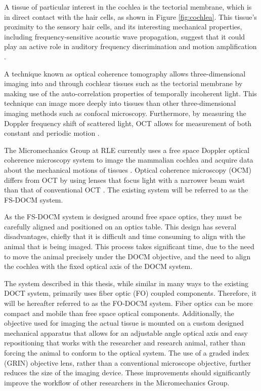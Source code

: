 A tissue of particular interest in the cochlea is the tectorial membrane, which is in direct contact with the hair cells, as shown in Figure \ref{fig:cochlea}. This tissue's proximity to the sensory hair cells, and its interesting mechanical properties, including frequency-sensitive acoustic wave propagation, suggest that it could play an active role in auditory frequency discrimination and motion amplification \cite{Ghaffari2010}. 


A technique known as optical coherence tomography allows three-dimensional imaging into and through cochlear tissues such as the tectorial membrane by making use of the auto-correlation properties of temporally incoherent light. This technique can image more deeply into tissues than other three-dimensional imaging methods such as confocal microscopy. Furthermore, by measuring the Doppler frequency shift of scattered light, OCT allows for measurement of both constant and periodic motion \cite{DrexlerBook}. 

The Micromechanics Group at RLE currently uses a free space Doppler optical coherence microscopy system to image the mammalian cochlea and acquire data about the mechanical motions of tissues  \cite{hong}. Optical coherence microscopy (OCM) differs from OCT by using lenses that focus light with a narrower beam waist than that of conventional OCT \cite{bouma}. The existing system will be referred to as the FS-DOCM system.

As the FS-DOCM system is designed around free space optics, they must be carefully aligned and positioned on an optics table. This design has several disadvantages, chiefly that it is difficult and time consuming to align with the animal that is being imaged. This process takes significant time, due to the need to move the animal precisely under the DOCM objective, and the need to align the cochlea with the fixed optical axis of the DOCM system.

The system described in this thesis, while similar in many ways to the existing DOCT system, primarily uses fiber optic (FO) coupled components. Therefore, it will be hereafter referred to as the FO-DOCM system. Fiber optics can be more compact and mobile than free space optical components. Additionally, the objective used for imaging the actual tissue is mounted on a custom designed mechanical apparatus that allows for an adjustable angle optical axis and easy repositioning that works with the researcher and research animal, rather than forcing the animal to conform to the optical system. The use of a graded index (GRIN) objective lens, rather than a conventional microscope objective, further reduces the size of the imaging device. These improvements should significantly improve the workflow of other researchers in the Micromechanics Group.

